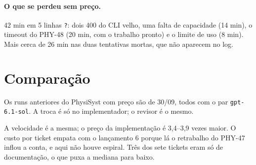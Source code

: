 \documentclass[11pt,a4paper]{article}
\begin{document}
\paragraph{O que se perdeu sem preço.} 42 min em 5 linhas \texttt{?}: dois 400
do CLI velho, uma falta de capacidade (14 min), o timeout do PHY-48 (20 min,
com o trabalho pronto) e o limite de uso (8 min). Mais cerca de 26 min nas duas
tentativas mortas, que não aparecem no log.

\section{Comparação}

Os runs anteriores do PhysiSyst com preço são de 30/09, todos com o par
\texttt{gpt-6.1-sol}. A troca é só no implementador; o revisor é o mesmo.

\medskip
{}

\medskip
A velocidade é a mesma; o preço da implementação é 3,4--3,9 vezes maior. O
custo por ticket empata com o lançamento 6 porque lá o retrabalho do PHY-47
inflou a conta, e aqui não houve espiral. Três dos sete tickets eram só de
documentação, o que puxa a mediana para baixo.
\end{document}
